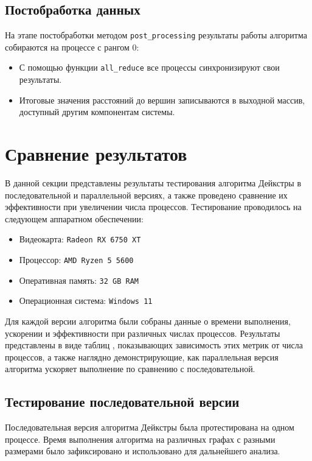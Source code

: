 \documentclass[a4paper,14pt]{extarticle}
\begin{document}
\subsection*{Постобработка данных}

На этапе постобработки методом \texttt{post\_processing} результаты работы алгоритма собираются на процессе с рангом 0:
\begin{itemize}
    \item С помощью функции \texttt{all\_reduce} все процессы синхронизируют свои результаты.
    \item Итоговые значения расстояний до вершин записываются в выходной массив, доступный другим компонентам системы.
\end{itemize}
\section*{Сравнение результатов}

В данной секции представлены результаты тестирования алгоритма Дейкстры в последовательной и параллельной версиях, а также проведено сравнение их эффективности при увеличении числа процессов. Тестирование проводилось на следующем аппаратном обеспечении:

\begin{itemize}
    \item Видеокарта: \texttt{Radeon RX 6750 XT}
    \item Процессор: \texttt{AMD Ryzen 5 5600}
    \item Оперативная память: \texttt{32 GB RAM}
    \item Операционная система: \texttt{Windows 11}
\end{itemize}
Для каждой версии алгоритма были собраны данные о времени выполнения, ускорении и эффективности при различных числах процессов. Результаты представлены в виде таблиц , показывающих зависимость этих метрик от числа процессов, а также наглядно демонстрирующие, как параллельная версия алгоритма ускоряет выполнение по сравнению с последовательной.

\subsection*{Тестирование последовательной версии}

Последовательная версия алгоритма Дейкстры была протестирована на одном процессе. Время выполнения алгоритма на различных графах с разными размерами было зафиксировано и использовано для дальнейшего анализа. 
\end{document}
